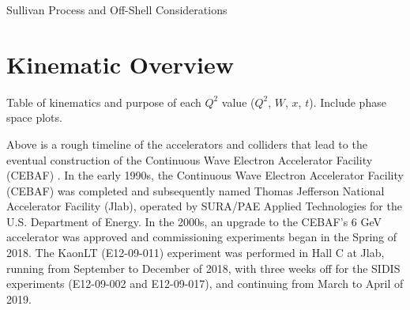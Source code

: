 \documentclass[
]{report}
\begin{document}
Sullivan Process and Off-Shell Considerations

\hypertarget{Section-3.6}{%
\section{Kinematic Overview}\label{Section-3.6}}

Table of kinematics and purpose of each \(Q^2\) value (\(Q^2\), \(W\),
\(x\), \(t\)). Include phase space plots.
\label{Chapter-4}

\begin{minipage}[t]{0.2\textwidth}
\end{minipage}
\hfill
\begin{minipage}[t]{0.7\textwidth}
\end{minipage}

Above is a rough timeline of the accelerators and colliders that lead to
the eventual construction of the Continuous Wave Electron Accelerator
Facility (CEBAF) \cite{cahn_experimental_1989}. In the early 1990s, the
Continuous Wave Electron Accelerator Facility (CEBAF) was completed and
subsequently named Thomas Jefferson National Accelerator Facility
(Jlab), operated by SURA/PAE Applied Technologies for the U.S.
Department of Energy. In the 2000s, an upgrade to the CEBAF's 6 GeV
accelerator was approved and commissioning experiments began in the
Spring of 2018. The KaonLT (E12-09-011) experiment was performed in Hall
C at Jlab, running from September to December of 2018, with three weeks
off for the SIDIS experiments (E12-09-002 and E12-09-017), and
continuing from March to April of 2019.
\end{document}
